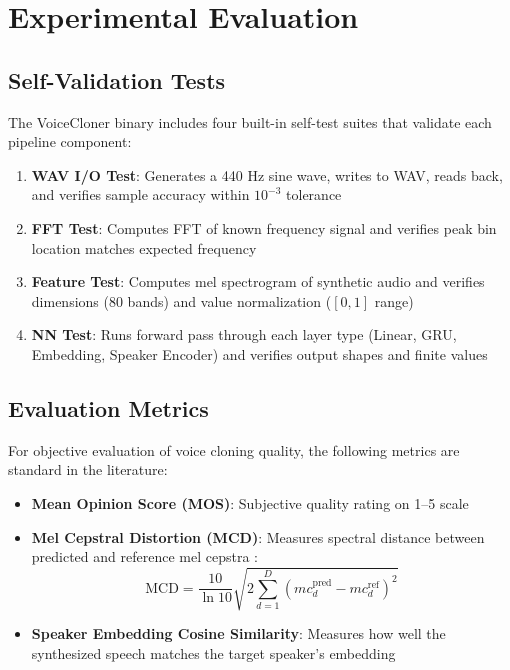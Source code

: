 \documentclass[conference]{IEEEtran}
\begin{document}
\section{Experimental Evaluation}

\subsection{Self-Validation Tests}

The VoiceCloner binary includes four built-in self-test suites that validate each pipeline component:

\begin{enumerate}
\item \textbf{WAV I/O Test}: Generates a 440 Hz sine wave, writes to WAV, reads back, and verifies sample accuracy within $10^{-3}$ tolerance
\item \textbf{FFT Test}: Computes FFT of known frequency signal and verifies peak bin location matches expected frequency
\item \textbf{Feature Test}: Computes mel spectrogram of synthetic audio and verifies dimensions (80 bands) and value normalization ($[0, 1]$ range)
\item \textbf{NN Test}: Runs forward pass through each layer type (Linear, GRU, Embedding, Speaker Encoder) and verifies output shapes and finite values
\end{enumerate}

\subsection{Evaluation Metrics}

For objective evaluation of voice cloning quality, the following metrics are standard in the literature:

\begin{itemize}
\item \textbf{Mean Opinion Score (MOS)}: Subjective quality rating on 1--5 scale \cite{itu1996p800}
\item \textbf{Mel Cepstral Distortion (MCD)}: Measures spectral distance between predicted and reference mel cepstra \cite{kubichek1993mel}:
\begin{equation}
\text{MCD} = \frac{10}{\ln 10} \sqrt{2 \sum_{d=1}^{D} (mc_d^{\text{pred}} - mc_d^{\text{ref}})^2}
\end{equation}
\item \textbf{Speaker Embedding Cosine Similarity}: Measures how well the synthesized speech matches the target speaker's embedding
\end{itemize}
\end{document}
